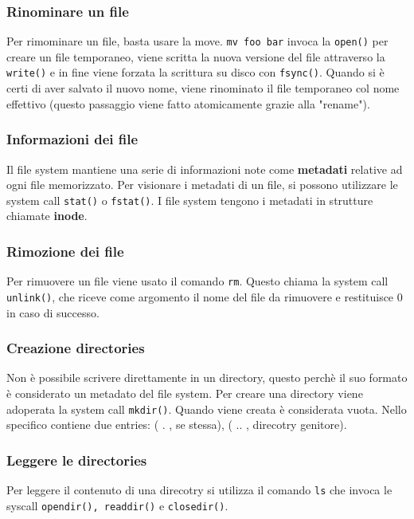 \documentclass[12pt, letterpaper]{article}
\begin{document}
			\subsubsection{Rinominare un file}
				Per rimominare un file, basta usare la move. \texttt{mv foo bar} invoca la \texttt{open()} per creare un file temporaneo, viene scritta la nuova versione del file attraverso la \texttt{write()} e in fine viene forzata la scrittura su disco con \texttt{fsync()}. Quando si è certi di aver salvato il nuovo nome, viene rinominato il file temporaneo col nome effettivo (questo passaggio viene fatto atomicamente grazie alla "rename").
				
			\subsubsection{Informazioni dei file}
				Il file system mantiene una serie di  informazioni note come \textbf{metadati} relative ad ogni file memorizzato. Per visionare i metadati di un file, si possono utilizzare le system call \texttt{stat()} o \texttt{fstat()}. I file system tengono i metadati in strutture chiamate \textbf{inode}. 
				
			\subsubsection{Rimozione dei file}
				Per rimuovere un file viene usato il comando \texttt{rm}. Questo chiama la system call \texttt{unlink()}, che riceve come argomento il nome del file da rimuovere e restituisce 0 in caso di successo. 
				
			\subsubsection{Creazione directories}
				Non è possibile scrivere direttamente in un directory, questo perchè il suo formato è considerato un metadato del file system. Per creare una directory viene adoperata la system call \texttt{mkdir()}. Quando viene creata è considerata vuota. Nello specifico contiene due entries: ( . , se stessa), ( .. , direcotry genitore).
				
			\subsubsection{Leggere le directories}
				Per leggere il contenuto di una direcotry si utilizza il comando \texttt{ls} che invoca le syscall \texttt{opendir(), readdir()} e \texttt{closedir()}.
				
\end{document}
